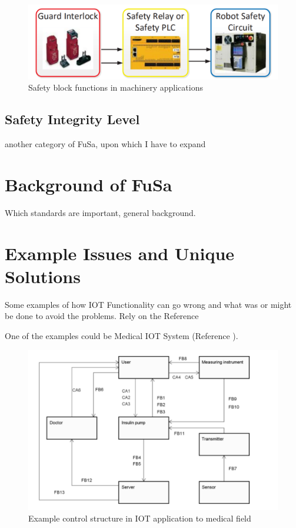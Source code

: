 \documentclass[conference]{IEEEtran}
\begin{document}
\begin{figure}[htbp]
\centerline{\includegraphics[scale=.33]{Machinery_FuSa.png}}
\caption{Safety block functions in machinery applications \cite{robinson_living_2019}}
\label{timeline}
\end{figure}

\subsection{Safety Integrity Level}

another category of FuSa, upon which I have to expand \cite{robinson_living_2019}

\section{Background of FuSa}

Which standards are important, general background.

\section{Example Issues and Unique Solutions}

Some examples of how IOT Functionality can go wrong and what was or might be done to avoid the problems. Rely on the Reference \cite{robinson_living_2019}

One of the examples could be Medical IOT System (Reference \cite{hayakawa_proposal_2018}).

\begin{figure}[htbp]
\centerline{\includegraphics[scale=.33]{Medical_IOT.png}}
\caption{Example control structure in IOT application to medical field \cite{hayakawa_proposal_2018}}
\label{timeline}
\end{figure}
\end{document}

